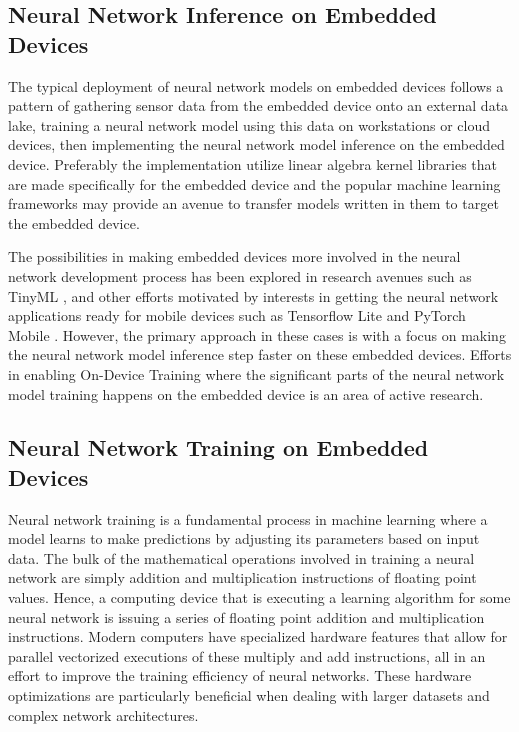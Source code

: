 \subsection{Neural Network Inference on Embedded Devices}

The typical deployment of neural network models on embedded devices follows a pattern of gathering sensor data from the embedded device onto an external data lake, training a neural network model using this data on workstations or cloud devices, then implementing the neural network model inference on the embedded device. Preferably the implementation utilize linear algebra kernel libraries that are made specifically for the embedded device and the popular machine learning frameworks may provide an avenue to transfer models written in them to target the embedded device.

The possibilities in making embedded devices more involved in the neural network development process has been explored in research avenues such as TinyML \cite{tinyml}, and other efforts motivated by interests in getting the neural network applications ready for mobile devices such as Tensorflow Lite \cite{tfl} and PyTorch Mobile \cite{pytorch-mobile}. However, the primary approach in these cases is with a focus on making the neural network model inference step faster on these embedded devices. Efforts in enabling On-Device Training where the significant parts of the neural network model training happens on the embedded device is an area of active research.

\subsection{Neural Network Training on Embedded Devices}

Neural network training is a fundamental process in machine learning where a model learns to make predictions by adjusting its parameters based on input data. The bulk of the mathematical operations involved in training a neural network are simply addition and multiplication instructions of floating point values. Hence, a computing device that is executing a learning algorithm for some neural network is issuing a series of floating point addition and multiplication instructions. Modern computers have specialized hardware features that allow for parallel vectorized executions of these multiply and add instructions, all in an effort to improve the training efficiency of neural networks. These hardware optimizations are particularly beneficial when dealing with larger datasets and complex network architectures.

